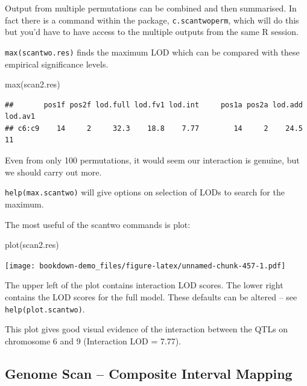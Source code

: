 \documentclass[
]{book}
\newenvironment{Shaded}{\begin{snugshade}}{\end{snugshade}}
\newcommand{\FunctionTok}[1]{\textcolor[rgb]{0.00,0.00,0.00}{#1}}
\newcommand{\NormalTok}[1]{#1}
\begin{document}
Output from multiple permutations can be combined and then summarised. In fact there is a command within the package, \texttt{c.scantwoperm}, which will do this but you'd have to have access to the multiple outputs from the same R session.

\texttt{max(scantwo.res)} finds the maximum LOD which can be compared with these empirical significance levels.

\begin{Shaded}
\begin{Highlighting}[]
\FunctionTok{max}\NormalTok{(scan2.res)}
\end{Highlighting}
\end{Shaded}

\begin{verbatim}
##       pos1f pos2f lod.full lod.fv1 lod.int     pos1a pos2a lod.add lod.av1
## c6:c9    14     2     32.3    18.8    7.77        14     2    24.5      11
\end{verbatim}

Even from only 100 permutations, it would seem our interaction is genuine, but we should carry out more.

\texttt{help(max.scantwo)} will give options on selection of LODs to search for the maximum.

The most useful of the scantwo commands is plot:

\begin{Shaded}
\begin{Highlighting}[]
\FunctionTok{plot}\NormalTok{(scan2.res)}
\end{Highlighting}
\end{Shaded}

\texttt{[image: bookdown-demo\_files/figure-latex/unnamed-chunk-457-1.pdf]}

The upper left of the plot contains interaction LOD scores. The lower right contains the LOD scores for the full model. These defaults can be altered -- see \texttt{help(plot.scantwo)}.

This plot gives good visual evidence of the interaction between the QTLs on chromosome 6 and 9 (Interaction LOD = 7.77).

\hypertarget{genome-scan-composite-interval-mapping}{%
\subsection{Genome Scan -- Composite Interval Mapping}\label{genome-scan-composite-interval-mapping}}
\end{document}
